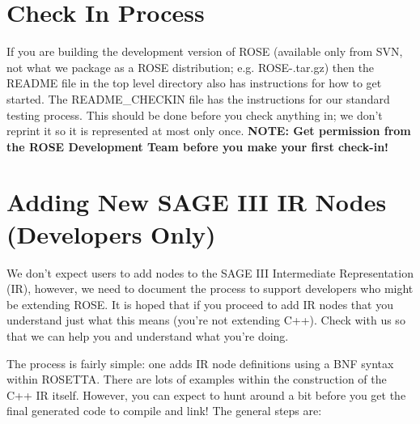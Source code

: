 \section{Check In Process}
   If you are building the development version of ROSE (available only from SVN, not what 
we package as a ROSE distribution; e.g. ROSE-\VersionNumber.tar.gz) then the README
file in the top level directory also has instructions for how to get started. 
The README\_CHECKIN file has the instructions for our standard testing process.
This should be done before you check anything in; we don't reprint it so it is
represented at most only once.
{\bf NOTE: Get permission from the ROSE Development Team before you make your first check-in!}



\section {Adding New SAGE III IR Nodes (Developers Only)}

    We don't expect users to add nodes to the SAGE III Intermediate Representation (IR),
however, we need to document the process to support developers who might be extending
ROSE.  It is hoped that if you proceed to add IR nodes that you understand just
what this means (you're not extending C++). Check with us so that we can help you and
understand what you're doing.

   The process is fairly simple: one adds IR node definitions using a BNF syntax within
ROSETTA.  There are lots of examples within the construction of the C++ IR itself.
However, you can expect to hunt around a bit before you get the final generated code to
compile and link!  The general steps are:


